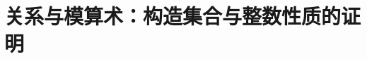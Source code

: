 
\chapter[关系与模算术]{关系与模算术：构造集合与整数性质的证明}\label{ch:chapter06}



\newpage


\newpage


\newpage


\newpage


\newpage


\newpage


\newpage
